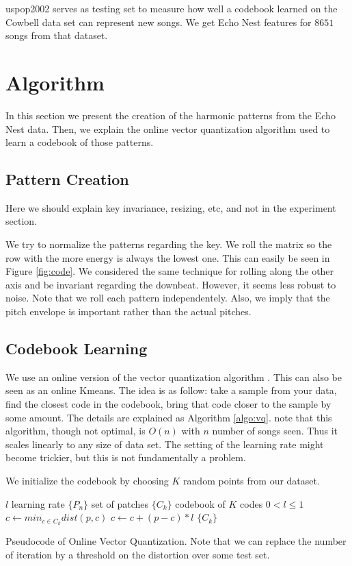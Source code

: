 \documentclass{article}
\begin{document}
uspop2002 serves as testing set to measure how well a codebook learned on
the Cowbell data set can represent new songs. We get Echo Nest features
for $8651$ songs from that dataset.

\section{Algorithm}\label{sec:algo}
In this section we present the creation of the harmonic patterns from
the Echo Nest data. Then, we explain the online vector quantization algorithm
used to learn a codebook of those patterns.

\subsection{Pattern Creation}
Here we should explain key invariance, resizing, etc, and not in the
experiment section.

We try to normalize the patterns regarding the key. We roll the matrix
so the row with the more energy is always the lowest one. This can easily be
seen in Figure \ref{fig:code}. We considered the same technique for rolling
along the other axis and be invariant regarding the downbeat. However, it
seems less robust to noise. Note that we roll each pattern independentely.
Also, we imply that the pitch envelope is important rather than the actual 
pitches.



\subsection{Codebook Learning}
We use an online version of the vector quantization algorithm 
\cite{Gersho1991}. This can also be seen as an online Kmeans.
The idea is as follow: take a sample from your data, find the closest
code in the codebook, bring that code closer to the sample by some amount.
The details are explained as Algorithm \ref{algo:vq}. note that this
algorithm, though not optimal, is $O(n)$ with $n$ number of songs seen.
Thus it scales linearly to any size of data set. The setting of the learning
rate might become trickier, but this is not fundamentally a problem.


We initialize the codebook by choosing $K$ random points from our dataset.


\begin{algorithm}
\begin{algorithmic}
\STATE$l$ learning rate
\STATE$\{P_n\}$ set of patches
\STATE$\{C_k\}$ codebook of $K$ codes
\REQUIRE $0 < l \leq 1$
\STATE$c \leftarrow min_{c \in C_k} dist(p,c)$
\STATE$c \leftarrow c + (p - c) * l$
\ENDFOR
\ENDFOR
\RETURN $\{C_k\}$
\caption{{Pseudocode of Online Vector Quantization. Note that we can replace
the number of iteration by a threshold on the distortion over some test set.}
\label{algo:vq}}
\end{algorithmic}
\end{algorithm}
\end{document}
